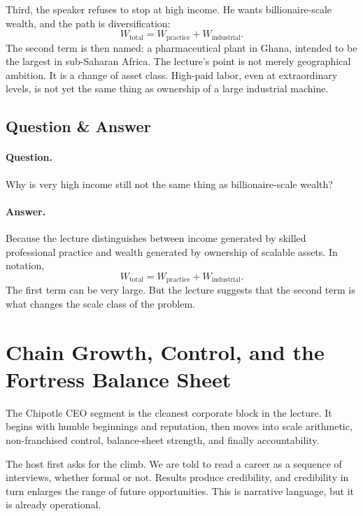 Third, the speaker refuses to stop at high income. He wants billionaire-scale wealth, and the path is diversification:
\begin{equation}
W_{\mathrm{total}} = W_{\mathrm{practice}} + W_{\mathrm{industrial}}.
\end{equation}
The second term is then named: a pharmaceutical plant in Ghana, intended to be the largest in sub-Saharan Africa. The lecture's point is not merely geographical ambition. It is a change of asset class. High-paid labor, even at extraordinary levels, is not yet the same thing as ownership of a large industrial machine.

\subsection{Question \& Answer}

\paragraph{Question.} Why is very high income still not the same thing as billionaire-scale wealth?

\paragraph{Answer.} Because the lecture distinguishes between income generated by skilled professional practice and wealth generated by ownership of scalable assets. In notation,
\[
W_{\mathrm{total}} = W_{\mathrm{practice}} + W_{\mathrm{industrial}}.
\]
The first term can be very large. But the lecture suggests that the second term is what changes the scale class of the problem.

\section{Chain Growth, Control, and the Fortress Balance Sheet}

The Chipotle CEO segment is the cleanest corporate block in the lecture. It begins with humble beginnings and reputation, then moves into scale arithmetic, non-franchised control, balance-sheet strength, and finally accountability.

The host first asks for the climb. We are told to read a career as a sequence of interviews, whether formal or not. Results produce credibility, and credibility in turn enlarges the range of future opportunities. This is narrative language, but it is already operational.

